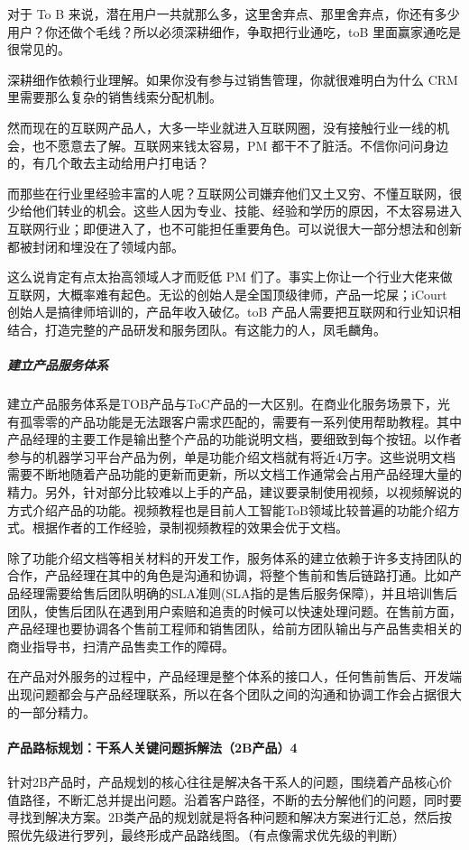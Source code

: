 \documentclass[letterpaper,11pt,english]{sphinxmanual}
\begin{document}
对于 To B
来说，潜在用户一共就那么多，这里舍弃点、那里舍弃点，你还有多少用户？你还做个毛线？所以必须深耕细作，争取把行业通吃，toB
里面赢家通吃是很常见的。

深耕细作依赖行业理解。如果你没有参与过销售管理，你就很难明白为什么 CRM
里需要那么复杂的销售线索分配机制。

然而现在的互联网产品人，大多一毕业就进入互联网圈，没有接触行业一线的机会，也不愿意去了解。互联网来钱太容易，PM
都干不了脏活。不信你问问身边的，有几个敢去主动给用户打电话？

而那些在行业里经验丰富的人呢？互联网公司嫌弃他们又土又穷、不懂互联网，很少给他们转业的机会。这些人因为专业、技能、经验和学历的原因，不太容易进入互联网行业；即便进入了，也不可能担任重要角色。可以说很大一部分想法和创新都被封闭和埋没在了领域内部。

这么说肯定有点太抬高领域人才而贬低 PM
们了。事实上你让一个行业大佬来做互联网，大概率难有起色。无讼的创始人是全国顶级律师，产品一坨屎；iCourt
创始人是搞律师培训的，产品年收入破亿。toB
产品人需要把互联网和行业知识相结合，打造完整的产品研发和服务团队。有这能力的人，凤毛麟角。


\subparagraph{建立产品服务体系}
\label{\detokenize{chapter_introduction/2B:id18}}
建立产品服务体系是TOB产品与ToC产品的一大区别。在商业化服务场景下，光有孤零零的产品功能是无法跟客户需求匹配的，需要有一系列使用帮助教程。其中产品经理的主要工作是输出整个产品的功能说明文档，要细致到每个按钮。以作者参与的机器学习平台产品为例，单是功能介绍文档就有将近4万字。这些说明文档需要不断地随着产品功能的更新而更新，所以文档工作通常会占用产品经理大量的精力。另外，针对部分比较难以上手的产品，建议要录制使用视频，以视频解说的方式介绍产品的功能。视频教程也是目前人工智能ToB领域比较普遍的功能介绍方式。根据作者的工作经验，录制视频教程的效果会优于文档。

除了功能介绍文档等相关材料的开发工作，服务体系的建立依赖于许多支持团队的合作，产品经理在其中的角色是沟通和协调，将整个售前和售后链路打通。比如产品经理需要给售后团队明确的SLA准则(SLA指的是售后服务保障)，并且培训售后团队，使售后团队在遇到用户索赔和追责的时候可以快速处理问题。在售前方面，产品经理也要协调各个售前工程师和销售团队，给前方团队输出与产品售卖相关的商业指导书，扫清产品售卖工作的障碍。

在产品对外服务的过程中，产品经理是整个体系的接口人，任何售前售后、开发端出现问题都会与产品经理联系，所以在各个团队之间的沟通和协调工作会占据很大的一部分精力。


\paragraph{产品路标规划：干系人关键问题拆解法（2B产品）4\sphinxfootnotemark[23]}
\label{\detokenize{chapter_introduction/2B:b-4}}%
\begin{footnotetext}[23]\sphinxAtStartFootnote
{}
%
\end{footnotetext}\ignorespaces 
针对2B产品时，产品规划的核心往往是解决各干系人的问题，围绕着产品核心价值路径，不断汇总并提出问题。沿着客户路径，不断的去分解他们的问题，同时要寻找到解决方案。2B类产品的规划就是将各种问题和解决方案进行汇总，然后按照优先级进行罗列，最终形成产品路线图。（有点像需求优先级的判断）
\end{document}
